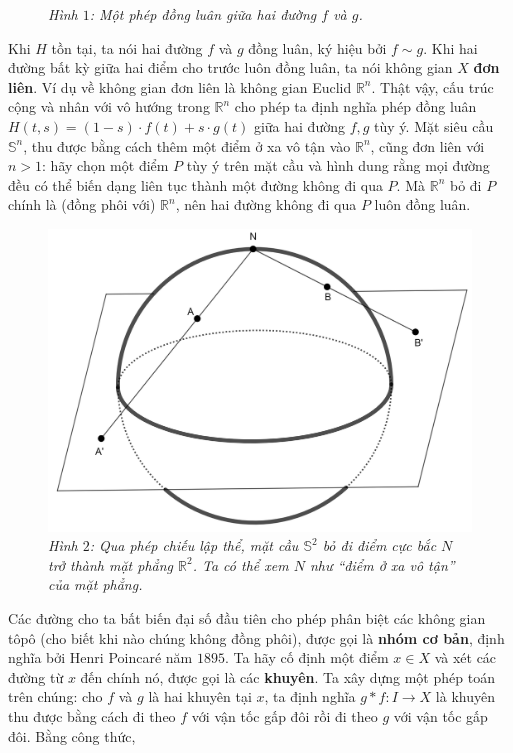 \begin{multicols}{2}
\begin{figure}[H]
		\caption{\small\textit{\color{duongvaotoanhoc}Hình $1$: Một phép đồng luân giữa hai đường $f$ và $g$.}}
		\vspace*{-10pt}
	\end{figure}
	Khi $H$ tồn tại, ta nói hai đường $f$ và $g$ đồng luân, ký hiệu bởi $f \sim g$. Khi hai đường bất kỳ giữa hai điểm cho trước luôn đồng luân, ta nói không gian $X$ {\bf\color{duongvaotoanhoc} đơn liên}. Ví dụ về không gian đơn liên là không gian Euclid $\mathbb{R}^n$. Thật vậy, cấu trúc cộng và nhân với vô hướng trong $\mathbb{R}^n$ cho phép ta định nghĩa phép đồng luân $H(t,s) = (1-s) \cdot f(t) + s \cdot g(t)$ giữa hai đường $f, g$ tùy ý. Mặt  siêu cầu $\mathbb{S}^n$, thu được bằng cách thêm một điểm ở xa vô tận vào $\mathbb{R}^n$, cũng đơn liên với $n > 1$: hãy chọn một điểm $P$ tùy ý trên mặt cầu và hình dung rằng mọi đường đều có thể biến dạng liên tục thành một đường không đi qua $P$. Mà $\mathbb{R}^n$ bỏ đi $P$ chính là (đồng phôi với) $\mathbb{R}^n$, nên hai đường không đi qua $P$ luôn đồng luân.
		\begin{figure}[H]
		\vspace*{-5pt}
		\centering
		\captionsetup{labelformat= empty, justification=centering}
		\includegraphics[width= 0.9\linewidth]{h2.png}
		\caption{\small\textit{\color{duongvaotoanhoc}Hình $2$: Qua phép chiếu lập thể, mặt cầu $\mathbb{S}^2$ bỏ đi điểm cực bắc $N$ trở thành mặt phẳng $\mathbb{R}^2$. Ta có thể xem $N$ như ``điểm ở xa vô tận'' của mặt phẳng.}}
		\vspace*{-10pt}
	\end{figure}
	Các đường cho ta bất biến đại số đầu tiên cho phép phân biệt các không gian tôpô (cho biết khi nào chúng không đồng phôi), được gọi là {\bf\color{duongvaotoanhoc} nhóm cơ bản}, định nghĩa bởi Henri Poincaré năm $1895$. Ta hãy cố định một điểm $x \in X$ và xét các đường từ $x$ đến chính nó, được gọi là các {\bf\color{duongvaotoanhoc} khuyên}. Ta xây dựng một phép toán trên chúng: cho $f$ và $g$ là hai khuyên tại $x$, ta định nghĩa $g \ast f: I \to X$ là khuyên thu được bằng cách đi theo $f$ với vận tốc gấp đôi rồi đi theo $g$ với vận tốc gấp đôi. Bằng công thức, 

\end{multicols}
